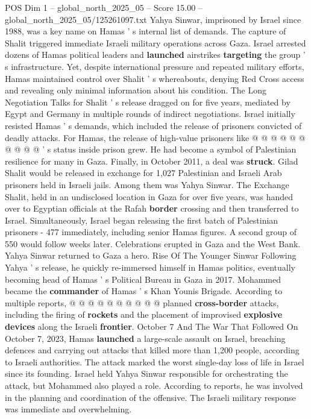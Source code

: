 \begin{textsample}{POS Dim 1 – global\_north\_2025\_05 – Score 15.00 – global\_north\_2025\_05/125261097.txt}
Yahya Sinwar, imprisoned by Israel since 1988, was a key name on Hamas ' s internal list of demands.
The capture of Shalit triggered immediate Israeli military operations across Gaza.
Israel arrested dozens of Hamas political leaders and \textbf{launched} airstrikes \textbf{targeting} the group ' s infrastructure.
Yet, despite international pressure and repeated military efforts, Hamas maintained control over Shalit ' s whereabouts, denying Red Cross access and revealing only minimal information about his condition.
The Long Negotiation Talks for Shalit ' s release dragged on for five years, mediated by Egypt and Germany in multiple rounds of indirect negotiations.
Israel initially resisted Hamas ' s demands, which included the release of prisoners convicted of deadly attacks.
For Hamas, the release of high-value prisoners like @ @ @ @ @ @ @ @ @ @ ' s status inside prison grew.
He had become a symbol of Palestinian resilience for many in Gaza.
Finally, in October 2011, a deal was \textbf{struck}.
Gilad Shalit would be released in exchange for 1,027 Palestinian and Israeli Arab prisoners held in Israeli jails.
Among them was Yahya Sinwar.
The Exchange Shalit, held in an undisclosed location in Gaza for over five years, was handed over to Egyptian officials at the Rafah \textbf{border} crossing and then transferred to Israel.
Simultaneously, Israel began releasing the first batch of Palestinian prisoners - 477 immediately, including senior Hamas figures.
A second group of 550 would follow weeks later.
Celebrations erupted in Gaza and the West Bank.
Yahya Sinwar returned to Gaza a hero.
Rise Of The Younger Sinwar Following Yahya ' s release, he quickly re-immersed himself in Hamas politics, eventually becoming head of Hamas ' s Political Bureau in Gaza in 2017.
Mohammed became the \textbf{commander} of Hamas ' s Khan Younis Brigade.
According to multiple reports, @ @ @ @ @ @ @ @ @ @ planned \textbf{cross-border} attacks, including the firing of \textbf{rockets} and the placement of improvised \textbf{explosive} \textbf{devices} along the Israeli \textbf{frontier}.
October 7 And The War That Followed On October 7, 2023, Hamas \textbf{launched} a large-scale assault on Israel, breaching defences and carrying out attacks that killed more than 1,200 people, according to Israeli authorities.
The attack marked the worst single-day loss of life in Israel since its founding.
Israel held Yahya Sinwar responsible for orchestrating the attack, but Mohammed also played a role.
According to reports, he was involved in the planning and coordination of the offensive.
The Israeli military response was immediate and overwhelming.

\end{textsample}
